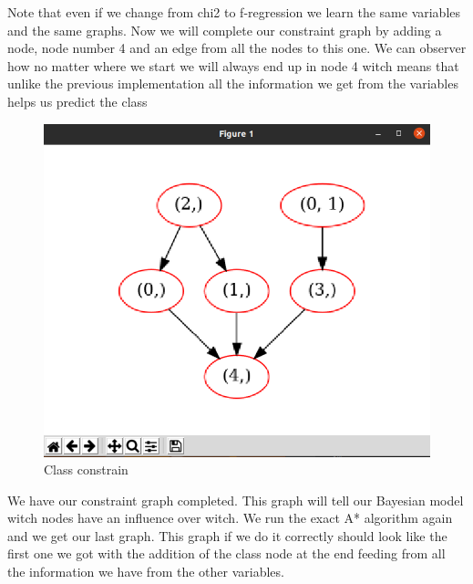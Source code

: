\documentclass{article} %
\begin{document}
\bigskip
Note that even if we change from chi2 to f-regression we learn the same variables and the same graphs.
\bigskip
Now we will complete our constraint graph by adding a node, node number 4 and an edge from all the nodes to this one. We can observer how no matter where we start we will always end up in node 4 witch means that unlike the previous implementation all the information we get from the variables helps us predict the class
\bigskip
\begin{figure}[h!]
  \includegraphics[width=\linewidth]{chi2-graph.png}
  \caption{Class constrain}
  \label{fig:basic graph}
\end{figure}
\bigskip
\bigskip
\bigskip
\bigskip
\bigskip
\bigskip
\bigskip
\bigskip
\bigskip
\bigskip
\bigskip
\bigskip
\bigskip
\bigskip
\bigskip
\bigskip
\bigskip
\bigskip
\bigskip
\bigskip
\bigskip
\bigskip
\bigskip
\bigskip
\bigskip
\bigskip
\bigskip
\bigskip
 We have our constraint graph completed. This graph will tell our Bayesian model witch nodes have an influence over witch. We run the exact A* algorithm again and we get our last graph. This graph if we do it correctly should look like the first one we got with the addition of the class node at the end feeding from all the information we have from the other variables.
\bigskip
\end{document}
